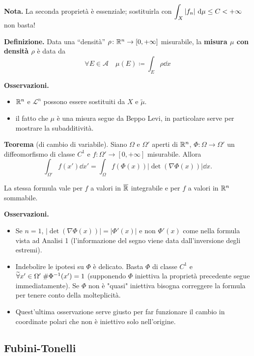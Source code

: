 \documentclass[a4paper, 12pt]{report}
\begin{document}
\textbf{Nota.}
La seconda proprietà è essenziale; sostituirla con $\displaystyle \int_X \left| f_n \right| \,\mathrm{d} \mu \leq C < + \infty$ non basta!

\textbf{Definizione.}
Data una ``densità'' $\rho \colon  \mathbb R^n \to [0,+\infty]$ misurabile, la \textbf{misura $\mu$ con densità $\rho$} è data da
$$
\forall E \in \mathcal A \quad \mu(E) \coloneqq \int_{E} \rho \dd x
$$ 

\textbf{Osservazioni.}
\begin{itemize}
	\item $\mathbb R^n$ e $\mathscr L^n$ possono essere sostituiti da $X$ e $\widetilde{\mu}$.
	\item il fatto che $\mu$ è una misura segue da Beppo Levi, in particolare serve per mostrare la subadditività.
\end{itemize}


\textbf{Teorema} (di cambio di variabile).
Siano $\Omega$ e $\Omega'$ aperti di $\mathbb R^n$, $\Phi \colon \Omega \to \Omega' $ un diffeomorfismo di classe $C^1$ e $f \colon \Omega' \to [0,+\infty]$ misurabile. Allora
$$
\int_{\Omega'} f(x') \dd x' = \int_{\Omega} f(\Phi(x)) \left| \det(\nabla \Phi(x)) \right| \dd x.
$$

La stessa formula vale per $f$ a valori in $\overline{\mathbb R}$ integrabile e per $f$ a valori in $\mathbb R^n$ sommabile.

\textbf{Osservazioni.}
\begin{itemize}
	\item Se $n = 1$, $\left| \det(\nabla \Phi(x)) \right| = \left| \Phi'(x) \right|$ e non $\Phi'(x)$ come nella formula vista ad Analisi 1 (l'informazione del segno viene data dall'inversione degli estremi).
	
	\item Indebolire le ipotesi su $\Phi$ è delicato. Basta $\Phi$ di classe $C^1$ e $\widetilde\forall x' \in \Omega' \; \# \Phi^{-1}(x') = 1$ (supponendo $\Phi$ iniettiva la proprietà precedente segue immediatamente).
	Se $\Phi$ non è "quasi" iniettiva bisogna correggere la formula per tenere conto della molteplicità.

	\item Quest'ultima osservazione serve giusto per far funzionare il cambio in coordinate polari che non è iniettivo solo nell'origine.
\end{itemize}

\subsection{Fubini-Tonelli}
\end{document}
